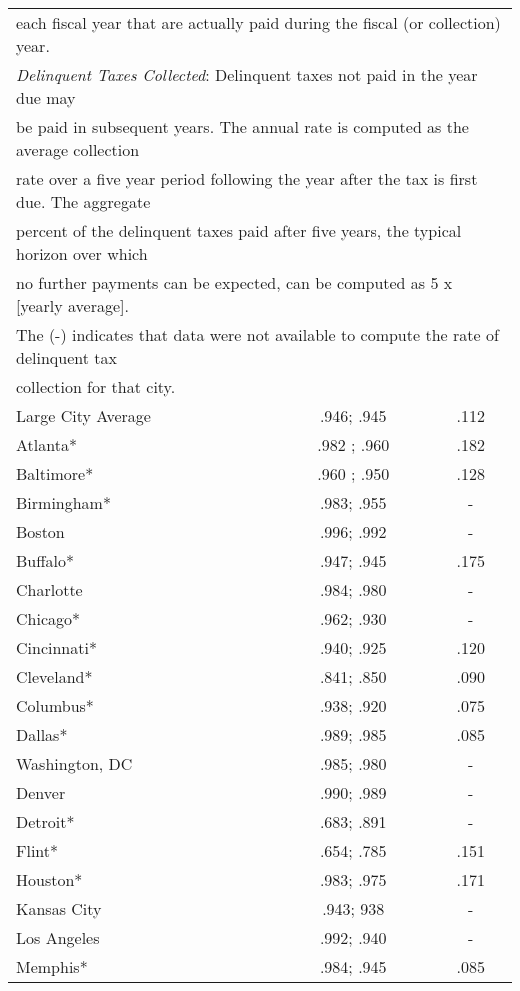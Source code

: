 \documentclass[12pt,titlepage]{article}
\begin{document}
\begin{center}
\begin{longtable}{| l | c |  c|}
\multicolumn{3}{l}{each fiscal year that are actually paid during the fiscal (or collection) year.} \\ 
\multicolumn{3}{l}{\textit{Delinquent Taxes Collected}: Delinquent taxes not paid in the year due may} \\
\multicolumn{3}{l}{be paid in subsequent years.  The annual rate is computed as the average collection} \\
\multicolumn{3}{l}{ rate over a five year period following the year after the tax is first due. The aggregate} \\
\multicolumn{3}{l}{ percent of the delinquent taxes paid after five years, the typical horizon over which} \\
\multicolumn{3}{l}{no further payments can be expected, can be computed as 5 x [yearly average].  } \\
\multicolumn{3}{l}{The (-) indicates that data were not available to compute the rate of delinquent tax} \\
\multicolumn{3}{l}{collection for that city.}  \\
\endlastfoot
Large City Average & .946; .945	& .112 \\
Atlanta*	  & .982 ;  .960 & .182 \\
Baltimore*	 & .960 ;  .950	 & .128 \\
Birmingham*	 & .983;  .955	& - \\
Boston	         & .996;  .992	 & - \\
Buffalo*	 & .947;  .945	 & .175 \\
Charlotte	 & .984;  .980	 & - \\
Chicago*	 & .962;  .930	 & - \\
Cincinnati*	 & .940;  .925	 & .120 \\
Cleveland*	 & .841;  .850	 & .090 \\
Columbus*	 & .938;  .920	 & .075 \\
Dallas*	         & .989;  .985	 & .085 \\
Washington, DC	 & .985;  .980	 & - \\
Denver	         & .990;  .989	 & - \\
Detroit*	 & .683;  .891	 & - \\
Flint*	         & .654;  .785	 & .151 \\
Houston*	 & .983;  .975	 & .171 \\
Kansas City	 & .943; 938	 & - \\
Los Angeles	 & .992;  .940	 & - \\
Memphis*	 & .984;  .945	 & .085 \\

\end{longtable}
\end{center}
\end{document}
